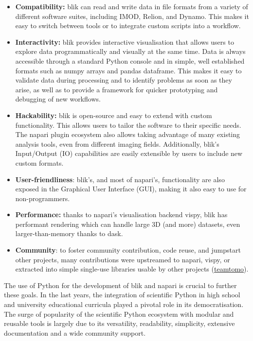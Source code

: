 \begin{itemize}
    \item \textbf{Compatibility:} blik can read and write data in file formats from a variety of different software suites, including IMOD, Relion, and Dynamo. This makes it easy to switch between tools or to integrate custom scripts into a workflow. 
    \item \textbf{Interactivity:} blik provides interactive visualisation that allows users to explore data programmatically and visually at the same time. Data is always accessible through a standard Python console and in simple, well established formats such as numpy arrays and pandas dataframe. This makes it easy to validate data during processing and to identify problems as soon as they arise, as well as to provide a framework for quicker prototyping and debugging of new workflows. 
    \item \textbf{Hackability:} blik is open-source and easy to extend with custom functionality. This allows users to tailor the software to their specific needs. The napari plugin ecosystem also allows taking advantage of many existing analysis tools, even from different imaging fields. Additionally, blik's Input/Output (IO) capabilities are easily extensible by users to include new custom formats. 
    \item \textbf{User-friendliness}: blik's, and most of napari's, functionality are also exposed in the Graphical User Interface (GUI), making it also easy to use for non-programmers. 
    \item \textbf{Performance:} thanks to napari's visualisation backend vispy, blik has performant rendering which can handle large 3D (and more) datasets, even larger-than-memory thanks to dask. 
    \item \textbf{Community}: to foster community contribution, code reuse, and jumpstart other projects, many contributions were upstreamed to napari, vispy, or extracted into simple single-use libraries usable by other projects (\href{https://github.com/teamtomo/}{teamtomo}).
\end{itemize}

The use of Python for the development of blik and napari is crucial to further these goals. In the last years, the integration of scientific Python in high school and university educational curricula played a pivotal role in its democratisation. The surge of popularity of the scientific Python ecosystem with modular and reusable tools is largely due to its versatility, readability, simplicity, extensive documentation and a wide community support.


